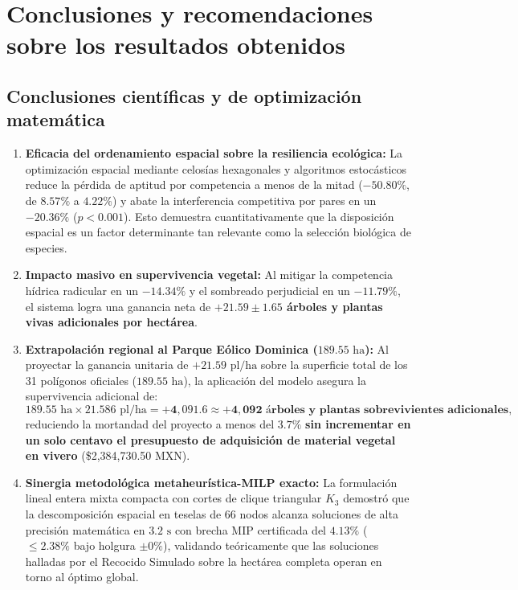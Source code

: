 \documentclass[11pt,a4paper]{article}
\begin{document}
\section{Conclusiones y recomendaciones sobre los resultados obtenidos}

\subsection{Conclusiones científicas y de optimización matemática}
\begin{enumerate}[leftmargin=1.5em]
    \item \textbf{Eficacia del ordenamiento espacial sobre la resiliencia ecológica:} La optimización espacial mediante celosías hexagonales y algoritmos estocásticos reduce la pérdida de aptitud por competencia a menos de la mitad (\textbf{$-50.80\%$}, de $8.57\%$ a $4.22\%$) y abate la interferencia competitiva por pares en un \textbf{$-20.36\%$} ($p < 0.001$). Esto demuestra cuantitativamente que la disposición espacial es un factor determinante tan relevante como la selección biológica de especies.
    \item \textbf{Impacto masivo en supervivencia vegetal:} Al mitigar la competencia hídrica radicular en un $-14.34\%$ y el sombreado perjudicial en un $-11.79\%$, el sistema logra una ganancia neta de \textbf{$+21.59 \pm 1.65$ árboles y plantas vivas adicionales por hectárea}. 
    \item \textbf{Extrapolación regional al Parque Eólico Dominica ($189.55\text{ ha}$):} Al proyectar la ganancia unitaria de $+21.59\text{ pl/ha}$ sobre la superficie total de los 31 polígonos oficiales ($189.55\text{ ha}$), la aplicación del modelo asegura la supervivencia adicional de:
    \begin{equation}
    189.55\text{ ha} \times 21.586\text{ pl/ha} = \mathbf{+4,091.6 \approx +4,092\text{ árboles y plantas sobrevivientes adicionales}},
    \end{equation}
    reduciendo la mortandad del proyecto a menos del $3.7\%$ \textbf{sin incrementar en un solo centavo el presupuesto de adquisición de material vegetal en vivero} (\$2,384,730.50 MXN).
    \item \textbf{Sinergia metodológica metaheurística-MILP exacto:} La formulación lineal entera mixta compacta con cortes de clique triangular $K_3$ demostró que la descomposición espacial en teselas de 66 nodos alcanza soluciones de alta precisión matemática en $3.2\text{ s}$ con brecha MIP certificada del $4.13\%$ ($\le 2.38\%$ bajo holgura $\pm 0\%$), validando teóricamente que las soluciones halladas por el Recocido Simulado sobre la hectárea completa operan en torno al óptimo global.

\end{enumerate}
\end{document}
